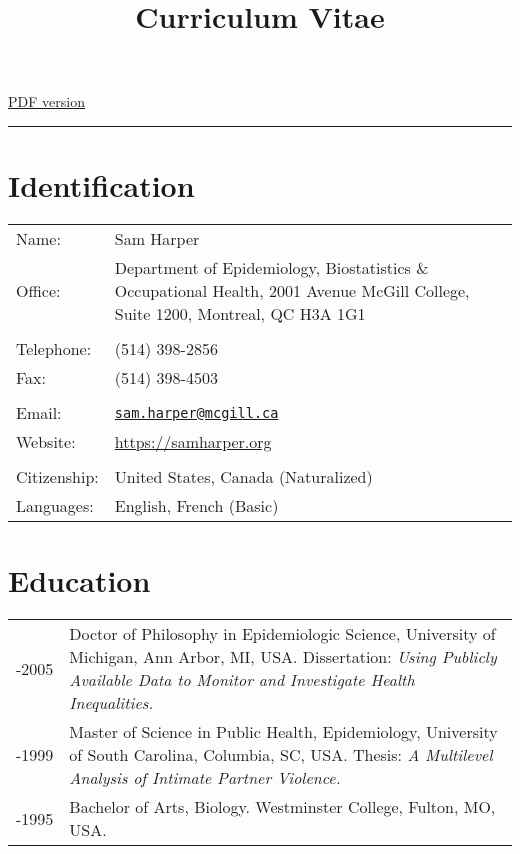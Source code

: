 \documentclass[
  letterpaper,
  DIV=11,
  numbers=noendperiod]{scrartcl}
\title{Curriculum Vitae}
\author{}
\date{}
\begin{document}
\maketitle
\href{../cv/index.pdf}{PDF version}

\begin{center}\rule{0.5\linewidth}{0.5pt}\end{center}

\section{Identification}\label{identification}

\begin{longtable}[]{@{}
  >{\raggedright\arraybackslash}p{}
  >{\raggedright\arraybackslash}p{}@{}}
\toprule\noalign{}
\endhead
\bottomrule\noalign{}
\endlastfoot
Name: & Sam Harper \\
Office: & Department of Epidemiology, Biostatistics \& Occupational
Health, 2001 Avenue McGill College, Suite 1200, Montreal, QC H3A 1G1 \\
& \\
Telephone: & (514) 398-2856 \\
Fax: & (514) 398-4503 \\
& \\
Email: &
\href{mailto:sam.harper@mcgill.ca}{\nolinkurl{sam.harper@mcgill.ca}} \\
Website: & \url{https://samharper.org} \\
& \\
Citizenship: & United States, Canada (Naturalized) \\
Languages: & English, French (Basic) \\
\end{longtable}

\section{Education}\label{education}

\begin{longtable}[]{@{}
  >{\raggedright\arraybackslash}p{}
  >{\raggedright\arraybackslash}p{}@{}}
\toprule\noalign{}
\endhead
\bottomrule\noalign{}
\endlastfoot
2001-2005 & Doctor of Philosophy in Epidemiologic Science, University of
Michigan, Ann Arbor, MI, USA. Dissertation: \emph{Using Publicly
Available Data to Monitor and Investigate Health Inequalities.} \\
1997-1999 & Master of Science in Public Health, Epidemiology, University
of South Carolina, Columbia, SC, USA. Thesis: \emph{A Multilevel
Analysis of Intimate Partner Violence.} \\
1991-1995 & Bachelor of Arts, Biology. Westminster College, Fulton, MO,
USA. \\
\end{longtable}
\end{document}

